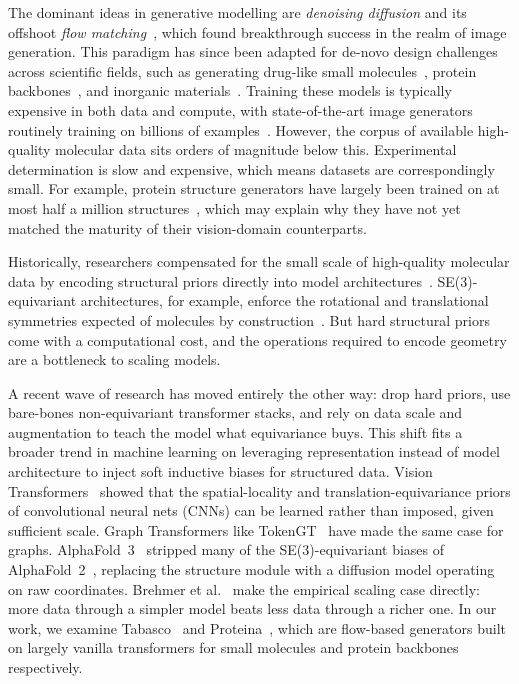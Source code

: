\documentclass[12pt,a4paper,twoside]{report}
\begin{document}
The dominant ideas in generative modelling are \emph{denoising diffusion} and its offshoot \emph{flow matching}~\cite{DDPM,FlowMatching}, which found breakthrough success in the realm of image generation. This paradigm has since been adapted for de-novo design challenges across scientific fields, such as generating drug-like small molecules~\cite{Tabasco}, protein backbones~\cite{RFdiffusion,Chroma,Proteina}, and inorganic materials~\cite{MatterGen}. Training these models is typically expensive in both data and compute, with state-of-the-art image generators routinely training on billions of examples~\cite{LAION5B}. However, the corpus of available high-quality molecular data sits orders of magnitude below this. Experimental determination is slow and expensive, which means datasets are correspondingly small. For example, protein structure generators have largely been trained on at most half a million structures~\cite{Proteina}, which may explain why they have not yet matched the maturity of their vision-domain counterparts.

Historically, researchers compensated for the small scale of high-quality molecular data by encoding structural priors directly into model architectures~\cite{BronsteinGDL}. SE(3)-equivariant architectures, for example, enforce the rotational and translational symmetries expected of molecules by construction~\cite{ThomasTFN}. But hard structural priors come with a computational cost, and the operations required to encode geometry are a bottleneck to scaling models.

A recent wave of research has moved entirely the other way: drop hard priors, use bare-bones non-equivariant transformer stacks, and rely on data scale and augmentation to teach the model what equivariance buys. This shift fits a broader trend in machine learning on leveraging representation instead of model architecture to inject soft inductive biases for structured data. Vision Transformers~\cite{ViT} showed that the spatial-locality and translation-equivariance priors of convolutional neural nets (CNNs) can be learned rather than imposed, given sufficient scale. Graph Transformers like TokenGT~\cite{TokenGT} have made the same case for graphs. AlphaFold~3~\cite{AlphaFold3} stripped many of the SE(3)-equivariant biases of AlphaFold~2~\cite{AlphaFold2}, replacing the structure module with a diffusion model operating on raw coordinates. Brehmer et al.~\cite{Brehmer2024} make the empirical scaling case directly: more data through a simpler model beats less data through a richer one. In our work, we examine Tabasco~\cite{Tabasco} and Proteina~\cite{Proteina}, which are flow-based generators built on largely vanilla transformers for small molecules and protein backbones respectively.
\end{document}

